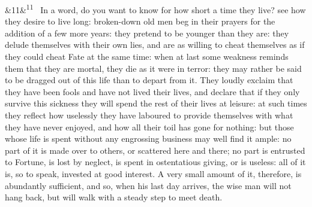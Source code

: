 \documentclass[12pt]{article}
\newcommand{\para}[1][]{\par\noindent\ifx&#1&\else\textsuperscript{\footnotesize #1}~\fi}
\begin{document}
\para[11] In a word, do you want to know for how short a time they live? see how they desire to live long: broken-down old men beg in their prayers for the addition of a few more years: they pretend to be younger than they are: they delude themselves with their own lies, and are as willing to cheat themselves as if they could cheat Fate at the same time: when at last some weakness reminds them that they are mortal, they die as it were in terror: they may rather be said to be dragged out of this life than to depart from it. They loudly exclaim that they have been fools and have not lived their lives, and declare that if they only survive this sickness they will spend the rest of their lives at leisure: at such times they reflect how uselessly they have laboured to provide themselves with what they have never enjoyed, and how all their toil has gone for nothing: but those whose life is spent without any engrossing business may well find it ample: no part of it is made over to others, or scattered here and there; no part is entrusted to Fortune, is lost by neglect, is spent in ostentatious giving, or is useless: all of it is, so to speak, invested at good interest. A very small amount of it, therefore, is abundantly sufficient, and so, when his last day arrives, the wise man will not hang back, but will walk with a steady step to meet death.
\end{document}

